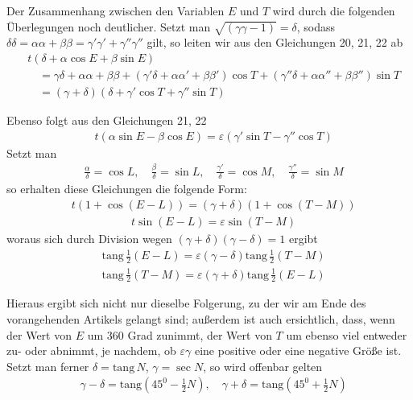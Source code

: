 
Der Zusammenhang zwischen den Variablen $E$ und $T$ wird durch die folgenden Überlegungen noch deutlicher. Setzt man $\surd{(\gamma\gamma-1)}=\delta$, sodass $\delta\delta=\alpha\alpha+\beta\beta=\gamma'\gamma'+\gamma''\gamma''$ gilt, so leiten wir aus den Gleichungen 20, 21, 22 ab
\[
\begin{aligned}
&t(\delta+\alpha\cos E+\beta\sin E)\\[8pt]
&\quad=\gamma\delta+\alpha\alpha+\beta\beta
+(\gamma'\delta+\alpha\alpha'+\beta\beta')\cos T
+(\gamma''\delta+\alpha\alpha''+\beta\beta'')\sin T\\[8pt]
&\quad=(\gamma+\delta)(\delta+\gamma'\cos T+\gamma''\sin T)
\end{aligned}
\]
\par Ebenso folgt aus den Gleichungen 21, 22
\[
\begin{aligned}
&t(\alpha\sin E-\beta\cos E)=\varepsilon(\gamma'\sin T-\gamma''\cos T)
\end{aligned}
\]
Setzt man
\[
\begin{aligned}
&\frac{\alpha}{\delta}=\cos L,\quad
\frac{\beta}{\delta}=\sin L,\quad
\frac{\gamma'}{\delta}=\cos M,\quad
\frac{\gamma''}{\delta}=\sin M
\end{aligned}
\]
so erhalten diese Gleichungen die folgende Form:
\[
\begin{aligned}
&t(1+\cos(E-L))=(\gamma+\delta)(1+\cos(T-M))
\end{aligned}
\]
\[
\begin{aligned}
&t\sin(E-L)=\varepsilon\sin(T-M)
\end{aligned}
\]
woraus sich durch Division wegen $(\gamma+\delta)(\gamma-\delta)=1$ ergibt
\[
\begin{aligned}
&\mathrm{tang}\,\frac12(E-L)=\varepsilon(\gamma-\delta)\mathrm{tang}\,\frac12(T-M)
\end{aligned}
\]
\[
\begin{aligned}
&\mathrm{tang}\,\frac12(T-M)=\varepsilon(\gamma+\delta)\mathrm{tang}\,\frac12(E-L)
\end{aligned}
\]
\par Hieraus ergibt sich nicht nur dieselbe Folgerung, zu der wir am Ende des vorangehenden Artikels gelangt sind; außerdem ist auch ersichtlich, dass, wenn der Wert von $E$ um 360 Grad zunimmt, der Wert von $T$ um ebenso viel entweder zu- oder abnimmt, je nachdem, ob $\varepsilon\gamma$ eine positive oder eine negative Größe ist. Setzt man ferner $\delta=\mathrm{tang}\,N$, $\gamma=\sec N$, so wird offenbar gelten
\[
\begin{aligned}
&\gamma-\delta=\mathrm{tang}(45^0-\frac12N),\quad
\gamma+\delta=\mathrm{tang}(45^0+\frac12N)
\end{aligned}
\]
\clearpage
\endgroup
